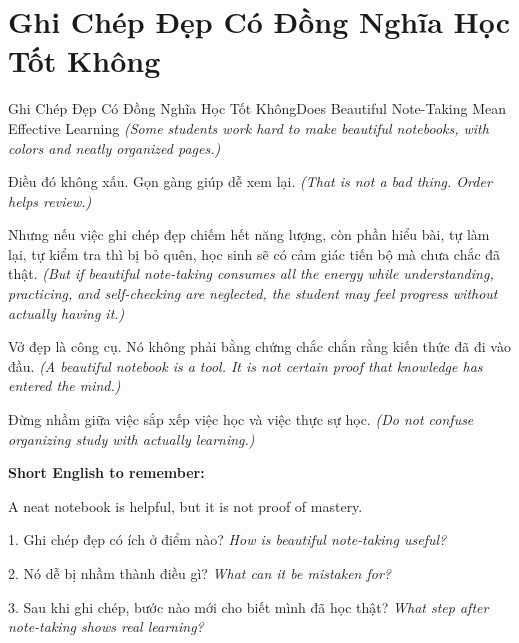 \section{Ghi Chép Đẹp Có Đồng Nghĩa Học Tốt Không}
\begin{truyen}{Ghi Chép Đẹp Có Đồng Nghĩa Học Tốt Không}{Does Beautiful Note-Taking Mean Effective Learning}
\textit{(Some students work hard to make beautiful notebooks, with colors and neatly organized pages.)}

Điều đó không xấu. Gọn gàng giúp dễ xem lại.
\textit{(That is not a bad thing. Order helps review.)}

Nhưng nếu việc ghi chép đẹp chiếm hết năng lượng, còn phần hiểu bài, tự làm lại, tự kiểm tra thì bị bỏ quên, học sinh sẽ có cảm giác tiến bộ mà chưa chắc đã thật.
\textit{(But if beautiful note-taking consumes all the energy while understanding, practicing, and self-checking are neglected, the student may feel progress without actually having it.)}

Vở đẹp là công cụ. Nó không phải bằng chứng chắc chắn rằng kiến thức đã đi vào đầu.
\textit{(A beautiful notebook is a tool. It is not certain proof that knowledge has entered the mind.)}
\end{truyen}

\begin{baihoc}
Đừng nhầm giữa việc sắp xếp việc học và việc thực sự học.
\textit{(Do not confuse organizing study with actually learning.)}
\end{baihoc}

\begin{ghinhoanh}
\textbf{Short English to remember:}

A neat notebook is helpful, but it is not proof of mastery.

\end{ghinhoanh}

\begin{tuhocnhanh}
1. Ghi chép đẹp có ích ở điểm nào? \textit{How is beautiful note-taking useful?}

2. Nó dễ bị nhầm thành điều gì? \textit{What can it be mistaken for?}

3. Sau khi ghi chép, bước nào mới cho biết mình đã học thật? \textit{What step after note-taking shows real learning?}
\end{tuhocnhanh}
\ngancach

